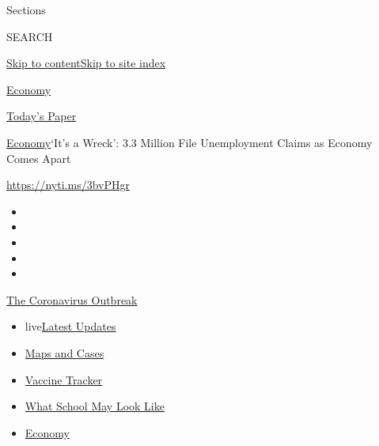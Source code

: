 Sections

SEARCH

\protect\hyperlink{site-content}{Skip to
content}\protect\hyperlink{site-index}{Skip to site index}

\href{https://www.nytimes.com/section/business/economy}{Economy}

\href{https://myaccount.nytimes.com/auth/login?response_type=cookie\&client_id=vi}{}

\href{https://www.nytimes.com/section/todayspaper}{Today's Paper}

\href{/section/business/economy}{Economy}\textbar{}`It's a Wreck': 3.3
Million File Unemployment Claims as Economy Comes Apart

\url{https://nyti.ms/3bvPHgr}

\begin{itemize}
\item
\item
\item
\item
\item
\end{itemize}

\href{https://www.nytimes.com/news-event/coronavirus?action=click\&pgtype=Article\&state=default\&region=TOP_BANNER\&context=storylines_menu}{The
Coronavirus Outbreak}

\begin{itemize}
\tightlist
\item
  live\href{https://www.nytimes.com/2020/08/01/world/coronavirus-covid-19.html?action=click\&pgtype=Article\&state=default\&region=TOP_BANNER\&context=storylines_menu}{Latest
  Updates}
\item
  \href{https://www.nytimes.com/interactive/2020/us/coronavirus-us-cases.html?action=click\&pgtype=Article\&state=default\&region=TOP_BANNER\&context=storylines_menu}{Maps
  and Cases}
\item
  \href{https://www.nytimes.com/interactive/2020/science/coronavirus-vaccine-tracker.html?action=click\&pgtype=Article\&state=default\&region=TOP_BANNER\&context=storylines_menu}{Vaccine
  Tracker}
\item
  \href{https://www.nytimes.com/interactive/2020/07/29/us/schools-reopening-coronavirus.html?action=click\&pgtype=Article\&state=default\&region=TOP_BANNER\&context=storylines_menu}{What
  School May Look Like}
\item
  \href{https://www.nytimes.com/live/2020/07/31/business/stock-market-today-coronavirus?action=click\&pgtype=Article\&state=default\&region=TOP_BANNER\&context=storylines_menu}{Economy}
\end{itemize}


